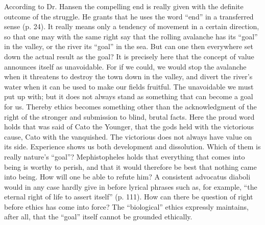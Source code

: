 \documentclass[12pt,a4paper,openany]{book}
\newcommand{\opage}[1]{\marginnote{\footnotesize\textit{[#1]}}}
\begin{document}
According to Dr. Hansen the compelling end is really given with the definite outcome of the struggle.
He grants that he uses the word ``end'' in a transferred sense (p. 24). It really means only a tendency
of movement in a certain direction, so that one may with the same right say that the rolling avalanche
has its ``goal'' in the valley, or the river its ``goal'' in the sea.
\opage{74}But can one then everywhere set down the actual result as the goal? It is precisely here that the
concept of value announces itself as unavoidable. For if we could, we would stop the avalanche when it
threatens to destroy the town down in the valley, and divert the river's water when it can be used to
make our fields fruitful. The unavoidable we must put up with; but it does not always stand as something
that can become a goal for us. Thereby ethics becomes something other than the acknowledgment of the
right of the stronger and submission to blind, brutal facts. Here the proud word holds that was said of
Cato the Younger, that the gods held with the victorious cause, Cato with the vanquished. The victorious
does not always have value on its side. Experience shows us both development and dissolution. Which of
them is really nature's ``goal''? Mephistopheles holds that everything that comes into being is worthy
to perish, and that it would therefore be best that nothing came into being. How will one be able to
refute him? A consistent advocatus diaboli would in any case hardly give in before lyrical phrases such
as, for example, ``the eternal right of life to assert itself'' (p. 111). How can there be question of
right before ethics has come into force? The ``biological'' ethics expressly maintains, after all, that
the ``goal'' itself cannot be grounded ethically.
\end{document}
